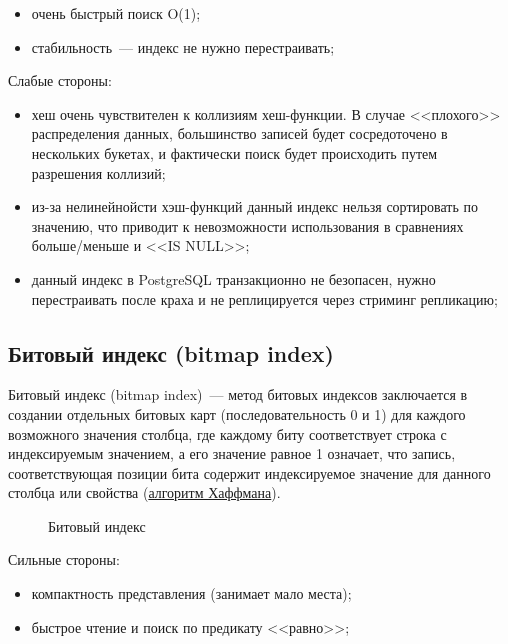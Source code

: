 \begin{itemize}
  \item очень быстрый поиск O(1);
  \item стабильность~--- индекс не нужно перестраивать;
\end{itemize}

Слабые стороны:

\begin{itemize}
  \item хеш очень чувствителен к коллизиям хеш-функции. В случае <<плохого>> распределения данных, большинство записей будет сосредоточено в нескольких букетах, и фактически поиск будет происходить путем разрешения коллизий;
  \item из-за нелинейнойсти хэш-функций данный индекс нельзя сортировать по значению, что приводит к невозможности использования в сравнениях больше/меньше и <<IS NULL>>;
  \item данный индекс в PostgreSQL транзакционно не безопасен, нужно перестраивать после краха и не реплицируется через стриминг репликацию;
\end{itemize}




\subsection{Битовый индекс (bitmap index)}
\label{sec:indexes-bitmap-index}

Битовый индекс (bitmap index)~--- метод битовых индексов заключается в создании отдельных битовых карт (последовательность 0 и 1) для каждого возможного значения столбца, где каждому биту соответствует строка с индексируемым значением, а его значение равное 1 означает, что запись, соответствующая позиции бита содержит индексируемое значение для данного столбца или свойства (\href{https://ru.wikipedia.org/wiki/%D0%9A%D0%BE%D0%B4_%D0%A5%D0%B0%D1%84%D1%84%D0%BC%D0%B0%D0%BD%D0%B0}{алгоритм Хаффмана}).

\begin{figure}[ht!]
  \caption{Битовый индекс}
  \label{fig:bitmap_index}
\end{figure}

Сильные стороны:

\begin{itemize}
  \item компактность представления (занимает мало места);
  \item быстрое чтение и поиск по предикату <<равно>>;
\end{itemize}

